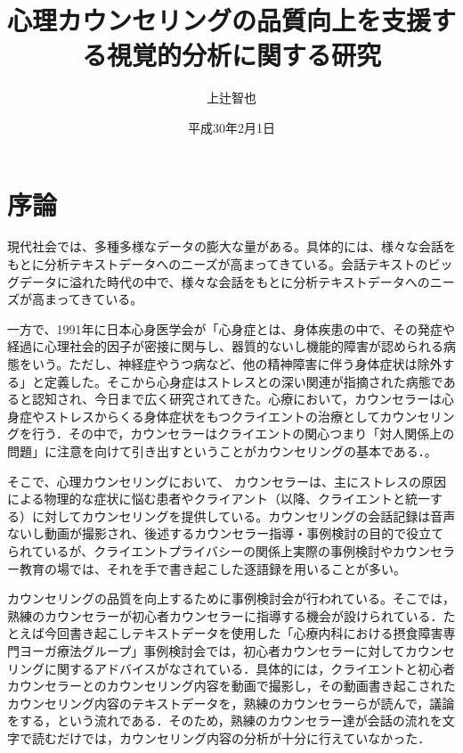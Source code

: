\documentclass[shuuron]{kuee}
\title{心理カウンセリングの品質向上を支援する視覚的分析に関する研究}
\author{上辻智也}
\date{平成30年2月1日}
\begin{document}
\maketitle
\tableofcontents


\chapter{序論}

現代社会では、多種多様なデータの膨大な量がある。具体的には、様々な会話をもとに分析テキストデータへのニーズが高まってきている。会話テキストのビッグデータに溢れた時代の中で、様々な会話をもとに分析テキストデータへのニーズが高まってきている。

一方で、1991年に日本心身医学会が「心身症とは、身体疾患の中で、その発症や経過に心理社会的因子が密接に関与し、器質的ないし機能的障害が認められる病態をいう。ただし、神経症やうつ病など、他の精神障害に伴う身体症状は除外する」と定義した。そこから心身症はストレスとの深い関連が指摘された病態であると認知され、今日まで広く研究されてきた。心療において，カウンセラーは心身症やストレスからくる身体症状をもつクライエントの治療としてカウンセリングを行う．その中で，カウンセラーはクライエントの関心つまり「対人関係上の問題」に注意を向けて引き出すということがカウンセリングの基本である\cite{zokad}．。

  そこで、心理カウンセリングにおいて、 カウンセラーは、主にストレスの原因による物理的な症状に悩む患者やクライアント（以降、クライエントと統一する）に対してカウンセリングを提供している。カウンセリングの会話記録は音声ないし動画が撮影され、後述するカウンセラー指導・事例検討の目的で役立てられているが、クライエントプライバシーの関係上実際の事例検討やカウンセラー教育の場では、それを手で書き起こした逐語録を用いることが多い。






カウンセリングの品質を向上するために事例検討会が行われている。そこでは，熟練のカウンセラーが初心者カウンセラーに指導する機会が設けられている．たとえば今回書き起こしテキストデータを使用した「心療内科における摂食障害専門ヨーガ療法グループ」事例検討会では，初心者カウンセラーに対してカウンセリングに関するアドバイスがなされている．具体的には，クライエントと初心者カウンセラーとのカウンセリング内容を動画で撮影し，その動画書き起こされたカウンセリング内容のテキストデータを，熟練のカウンセラーらが読んで，議論をする，という流れである．そのため，熟練のカウンセラー達が会話の流れを文字で読むだけでは，カウンセリング内容の分析が十分に行えていなかった．
\end{document}
